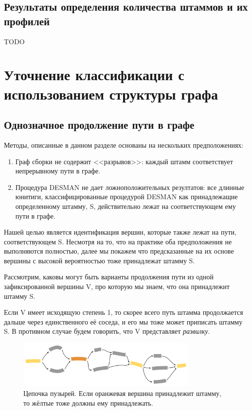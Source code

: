\documentclass{spbau-diploma}
\begin{document}
\subsection{Результаты определения количества штаммов и их профилей}
TODO



\section{Уточнение классификации с использованием структуры графа}
\subsection{Однозначное продолжение пути в графе}
Методы, описанные в данном разделе основаны на нескольких предположениях: 
\begin{enumerate}
    \item Граф сборки не содержит <<разрывов>>: каждый штамм соответствует непрерывному пути в графе.
    \item Процедура DESMAN не дает ложноположительных резултатов: все длинные юнитиги, классифицированные процедурой DESMAN как принадлежащие определенному штамму, S, действительно лежат на соответствующем ему пути в графе. 
\end{enumerate}

Нашей целью является идентификация вершин, которые также лежат на пути, соответствующем S. Несмотря на то, что на практике оба предположения не выполняются полностью, далее мы покажем что предсказанные на их основе вершины с высокой вероятностью тоже принадлежат штамму S.

Рассмотрим, каковы могут быть варианты продолжения пути из одной зафиксированной вершины V, про которую мы знаем, что она принадлежит штамму S.

Если V имеет исходящую степень 1, то скорее всего путь штамма продолжается дальше через единственного её соседа, и его мы тоже может приписать штамму S.
В противном случае будем говорить, что V представляет \textit{развилку}.


\begin{figure}[t]
\centering
\includegraphics[width=0.8\textwidth]{pics/bubbles_chain.png}
\caption{Цепочка пузырей. Если оранжевая вершина принадлежит штамму, то жёлтые тоже должны ему принадлежать.}
\label{bubbles_chain}
\end{figure}
\end{document}
